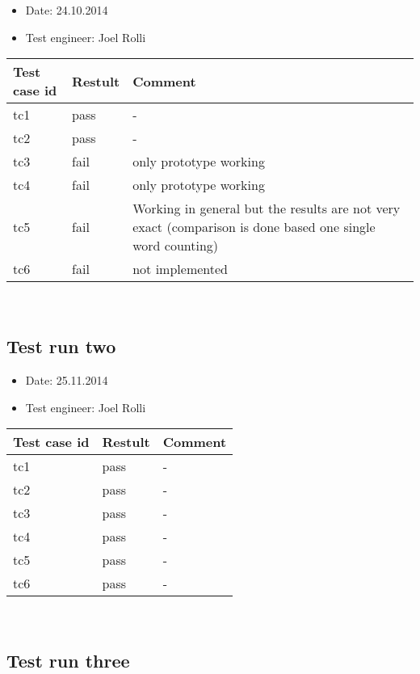 	\begin{itemize}
	\item Date: 24.10.2014
	\item Test engineer: Joel Rolli 
	\end{itemize}	


	\begin{tabular}{ | p{3cm} | p{2cm} | p{7cm} |}
	\hline
	\textbf{Test case id} 					& \textbf{Restult} & \textbf{Comment} 		\\ 	\hline
	tc1 & pass & - \\ \hline	
	tc2 & pass & - \\ \hline	
	tc3 & fail & only prototype working \\ \hline	
	tc4 & fail & only prototype working \\ \hline	
	tc5 & fail & Working in general but the results are not very exact (comparison is done based one single word counting) \\ \hline	
	tc6 & fail & not implemented \\ \hline	
	\end{tabular} \\


	\subsection{Test run two}

	\begin{itemize}
	\item Date: 25.11.2014
	\item Test engineer: Joel Rolli 
	\end{itemize}	


	\begin{tabular}{ | p{3cm} | p{2cm} | p{3cm} |}
	\hline
	\textbf{Test case id} 					& \textbf{Restult} & \textbf{Comment} 		\\ 	\hline
	tc1 & pass & - \\ \hline	
	tc2 & pass & - \\ \hline	
	tc3 & pass & - \\ \hline	
	tc4 & pass & - \\ \hline	
	tc5 & pass & - \\ \hline	
	tc6 & pass & - \\ \hline	
	\end{tabular} \\


		\subsection{Test run three}

